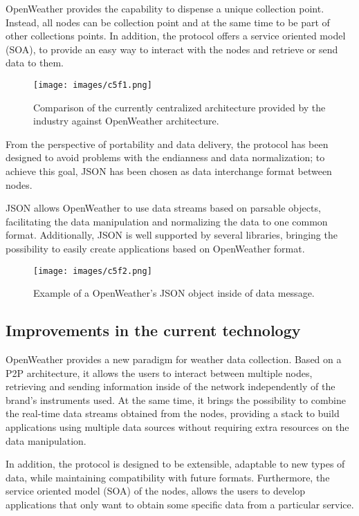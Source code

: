 OpenWeather provides the capability to dispense a unique collection point. Instead, all nodes can be collection point and at the same time to be part of other collections points. In addition, the protocol offers a service oriented model (\gls{SOA}), to provide an easy way to interact with the nodes and retrieve or send data to them.

\begin{figure}[H]
\centerline{\texttt{[image: images/c5f1.png]}}
\caption{Comparison of the currently centralized architecture provided by the industry against OpenWeather architecture.}
\end{figure}

From the perspective of portability and data delivery, the protocol has been designed to avoid problems with the endianness and data normalization; to achieve this goal, \gls{JSON}\cite{rfc4627} has been chosen as data interchange format between nodes.

\gls{JSON} allows OpenWeather to use data streams based on parsable objects, facilitating the data manipulation and normalizing the data to one common format. Additionally, \gls{JSON} is well supported by several libraries\cite{JSONW}, bringing the possibility to easily create applications based on OpenWeather format.

\begin{figure}[H]
\centerline{\texttt{[image: images/c5f2.png]}}
\caption{Example of a OpenWeather's JSON object inside of data message.}
\end{figure}

\subsection{Improvements in the current technology}

OpenWeather provides a new paradigm for weather data collection. Based on a \gls{P2P} architecture, it allows the users to interact between multiple nodes, retrieving and sending information inside of the network independently of the brand's instruments used. At the same time, it brings the possibility to combine the real-time data streams obtained from the nodes, providing a stack to build applications using multiple data sources without requiring extra resources on the data manipulation.

In addition, the protocol is designed to be extensible, adaptable to new types of data, while maintaining compatibility with future formats. Furthermore, the service oriented model (\gls{SOA}) of the nodes, allows the users to develop applications that only want to obtain some specific data from a particular service.

